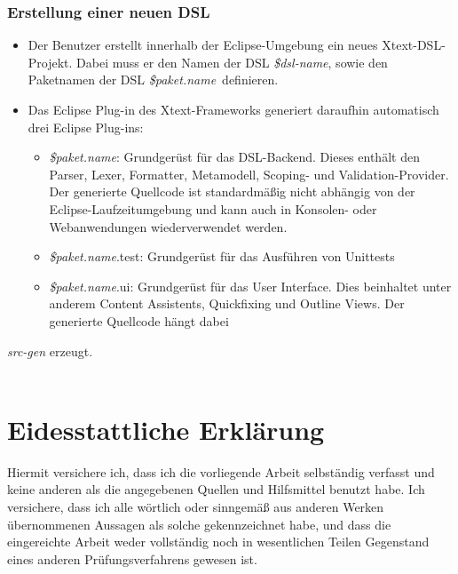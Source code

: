 \documentclass[a4paper,12pt]{scrreprt}
\begin{document}
\subsection{Erstellung einer neuen DSL}
\newcommand{\paketname}[0]{{\textit{\${paket.name}}}}
\newcommand{\dslname}[0]{{\textit{\${dsl-name}}}}
\begin{itemize}
	\item Der Benutzer erstellt innerhalb der Eclipse-Umgebung ein neues Xtext-DSL-Projekt.
	Dabei muss er den Namen der DSL \dslname, sowie den Paketnamen der DSL \paketname\ definieren.
	\item Das Eclipse Plug-in des Xtext-Frameworks generiert daraufhin automatisch drei Eclipse Plug-ins:
	\begin{itemize}
		\item \paketname: Grundgerüst für das DSL-Backend. Dieses enthält den Parser, Lexer, Formatter,  Metamodell, Scoping- und Validation-Provider. Der generierte Quellcode ist standardmäßig nicht abhängig von der Eclipse-Laufzeitumgebung und kann auch in Konsolen- oder Webanwendungen wiederverwendet werden.
		\item \paketname.test: Grundgerüst für das Ausführen von Unittests
		\item \paketname.ui: Grundgerüst für das User Interface. Dies beinhaltet unter anderem Content Assistents, Quickfixing und Outline Views. Der generierte Quellcode hängt dabei 

\end{itemize}
\end{itemize}

\emph{src-gen} erzeugt. 
\\
\\


\appendix

\leerSeiteAnhang

\chapter*{Eidesstattliche Erklärung}
Hiermit versichere ich, dass ich die vorliegende Arbeit selbständig verfasst und keine anderen als die angegebenen Quellen und Hilfsmittel benutzt habe. Ich versichere, dass ich alle wörtlich oder sinngemäß aus anderen Werken übernommenen Aussagen als solche gekennzeichnet habe, und dass die eingereichte Arbeit weder vollständig noch in wesentlichen Teilen Gegenstand eines anderen Prüfungsverfahrens gewesen ist.
\end{document}
